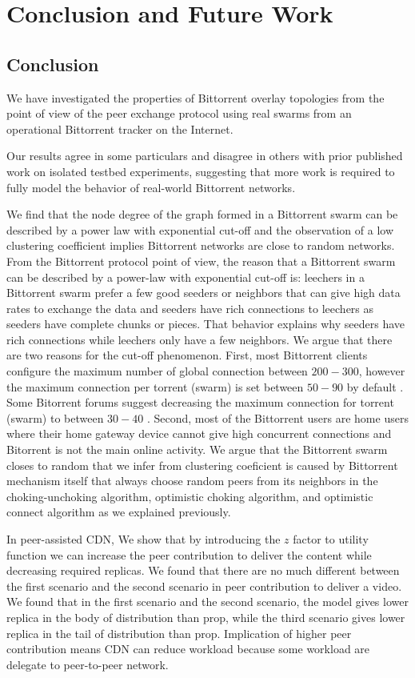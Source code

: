 \chapter{Conclusion and Future Work}

\section{Conclusion}
We have investigated the properties of Bittorrent overlay topologies from the point of view of the peer exchange protocol using real swarms from an operational Bittorrent tracker on the Internet. 

Our results agree in some particulars and disagree in others with prior published work on isolated testbed experiments, suggesting that more work is required to fully model the behavior of real-world Bittorrent networks.

We find that the node degree of the graph formed in a Bittorrent swarm can be described by a power law with exponential cut-off and the observation of a low clustering coefficient implies Bittorrent networks are close to random networks.
From the Bittorrent protocol point of view, the reason that a Bittorrent swarm can be described by a power-law with exponential cut-off is: leechers in a Bittorrent swarm prefer a few good seeders or neighbors that can give high data rates to exchange the data and seeders have rich connections to leechers as seeders have complete chunks or pieces. 
That behavior explains why seeders have rich connections while leechers only have a few neighbors. 
We argue that there are two reasons for the cut-off phenomenon. 
First, most Bittorrent clients configure the maximum number of global connection between $200-300$, however the maximum connection per torrent (swarm) is set between $50 - 90$ by default \cite{clientv}\cite{clientu}.
Some Bitorrent forums suggest decreasing the maximum connection for torrent (swarm) to between $30-40$ \cite{clientf}. 
Second, most of the Bittorrent users are home users where their home gateway device cannot give high concurrent connections and Bitorrent is not the main online activity. 
We argue that the Bittorrent swarm closes to random that we infer from clustering coeficient is caused by Bittorrent mechanism itself that always choose random peers from its neighbors in the choking-unchoking algorithm, optimistic choking algorithm, and optimistic connect algorithm as we explained previously.


In peer-assisted CDN, We show that by introducing the $z$ factor to utility function we can increase the peer contribution to deliver the content while decreasing required replicas. 
We found that there are no much different between the first scenario and the second scenario in peer contribution to deliver a video.
We found that in the first scenario and the second scenario, the model gives lower replica in the body of distribution than prop, while the third scenario gives lower replica in the tail of distribution than prop.
Implication of higher peer contribution means CDN can reduce workload because some workload are delegate to peer-to-peer network.

